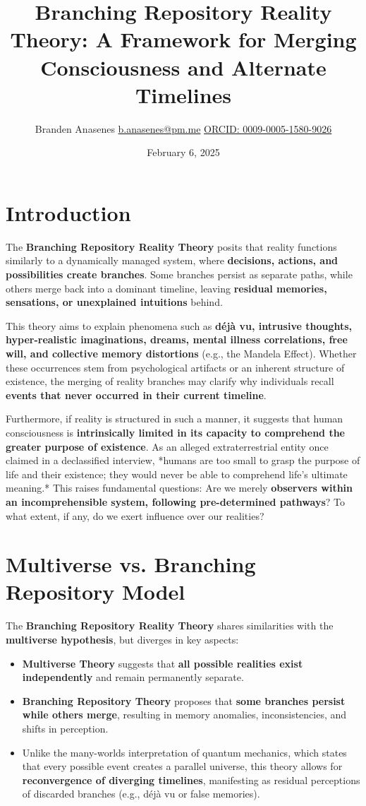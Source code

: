 \documentclass{article}
\title{Branching Repository Reality Theory: A Framework for Merging Consciousness and Alternate Timelines}
\author{Branden Anasenes \href{mailto:b.anasenes@pm.me}{b.anasenes@pm.me} \href{https://orcid.org/0009-0005-1580-9026}{ORCID: 0009-0005-1580-9026}}
\date{February 6, 2025}
\begin{document}
\maketitle

\section{Introduction}
The \textbf{Branching Repository Reality Theory} posits that reality functions similarly to a dynamically managed system, where \textbf{decisions, actions, and possibilities create branches}. Some branches persist as separate paths, while others merge back into a dominant timeline, leaving \textbf{residual memories, sensations, or unexplained intuitions} behind.

This theory aims to explain phenomena such as \textbf{d\'ej\`a vu, intrusive thoughts, hyper-realistic imaginations, dreams, mental illness correlations, free will, and collective memory distortions} (e.g., the Mandela Effect). Whether these occurrences stem from psychological artifacts or an inherent structure of existence, the merging of reality branches may clarify why individuals recall \textbf{events that never occurred in their current timeline}.

Furthermore, if reality is structured in such a manner, it suggests that human consciousness is \textbf{intrinsically limited in its capacity to comprehend the greater purpose of existence}. As an alleged extraterrestrial entity once claimed in a declassified interview, *humans are too small to grasp the purpose of life and their existence; they would never be able to comprehend life’s ultimate meaning.* This raises fundamental questions: Are we merely \textbf{observers within an incomprehensible system, following pre-determined pathways}? To what extent, if any, do we exert influence over our realities?

\section{Multiverse vs. Branching Repository Model}
The \textbf{Branching Repository Reality Theory} shares similarities with the \textbf{multiverse hypothesis}, but diverges in key aspects:
\begin{itemize}
    \item \textbf{Multiverse Theory} suggests that \textbf{all possible realities exist independently} and remain permanently separate.
    \item \textbf{Branching Repository Theory} proposes that \textbf{some branches persist while others merge}, resulting in memory anomalies, inconsistencies, and shifts in perception.
    \item Unlike the many-worlds interpretation of quantum mechanics, which states that every possible event creates a parallel universe, this theory allows for \textbf{reconvergence of diverging timelines}, manifesting as residual perceptions of discarded branches (e.g., d\'ej\`a vu or false memories).
\end{itemize}
\end{document}

